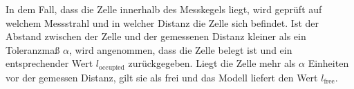 In dem Fall, dass die Zelle innerhalb des Messkegels liegt, wird geprüft auf welchem Messstrahl und in welcher Distanz die Zelle sich befindet. Ist der Abstand zwischen der Zelle und der gemessenen Distanz kleiner als ein Toleranzmaß $\alpha$, wird angenommen, dass die Zelle belegt ist und ein entsprechender Wert $l_{\text{occupied}}$ zurückgegeben. Liegt die Zelle mehr als $\alpha$ Einheiten vor der gemessen Distanz, gilt sie als frei und das Modell liefert den Wert $l_{\text{free}}$.